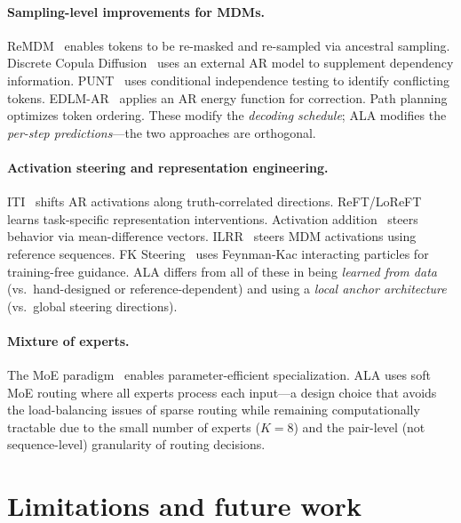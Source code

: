 \documentclass{article} %
\begin{document}
\paragraph{Sampling-level improvements for MDMs.}
ReMDM~\citep{shi2025remdm} enables tokens to be re-masked and re-sampled via ancestral sampling.
Discrete Copula Diffusion~\citep{nisonoff2025copula} uses an external AR model to supplement dependency information.
PUNT~\citep{chen2025punt} uses conditional independence testing to identify conflicting tokens.
EDLM-AR~\citep{sun2025edlm} applies an AR energy function for correction.
Path planning~\citep{gat2025p2} optimizes token ordering.
These modify the \emph{decoding schedule}; ALA modifies the \emph{per-step predictions}---the two approaches are orthogonal.

\paragraph{Activation steering and representation engineering.}
ITI~\citep{li2023iti} shifts AR activations along truth-correlated directions.
ReFT/LoReFT~\citep{wu2024reft} learns task-specific representation interventions.
Activation addition~\citep{turner2024steering} steers behavior via mean-difference vectors.
ILRR~\citep{wang2026ilrr} steers MDM activations using reference sequences.
FK Steering~\citep{niehues2025fk} uses Feynman-Kac interacting particles for training-free guidance.
ALA differs from all of these in being \emph{learned from data} (vs.\ hand-designed or reference-dependent) and using a \emph{local anchor architecture} (vs.\ global steering directions).

\paragraph{Mixture of experts.}
The MoE paradigm~\citep{shazeer2017moe} enables parameter-efficient specialization.
ALA uses soft MoE routing where all experts process each input---a design choice that avoids the load-balancing issues of sparse routing while remaining computationally tractable due to the small number of experts ($K{=}8$) and the pair-level (not sequence-level) granularity of routing decisions.


\section{Limitations and future work}
\label{sec:limitations}
\end{document}
